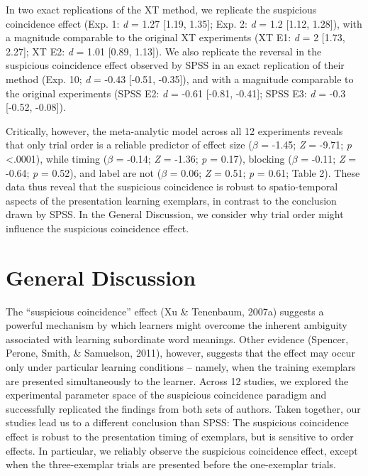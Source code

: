 \documentclass[english,floatsintext,man]{apa6}
\newcounter{author}
\theoremstyle{definition}
\theoremstyle{definition}
\theoremstyle{definition}
\theoremstyle{remark}
\begin{document}
In two exact replications of the XT method, we replicate the suspicious
coincidence effect (Exp. 1: \emph{d} = 1.27 {[}1.19, 1.35{]}; Exp. 2:
\emph{d} = 1.2 {[}1.12, 1.28{]}), with a magnitude comparable to the
original XT experiments (XT E1: \emph{d} = 2 {[}1.73, 2.27{]}; XT E2:
\emph{d} = 1.01 {[}0.89, 1.13{]}). We also replicate the reversal in the
suspicious coincidence effect observed by SPSS in an exact replication
of their method (Exp. 10; \emph{d} = -0.43 {[}-0.51, -0.35{]}), and with
a magnitude comparable to the original experiments (SPSS E2: \emph{d} =
-0.61 {[}-0.81, -0.41{]}; SPSS E3: \emph{d} = -0.3 {[}-0.52, -0.08{]}).

Critically, however, the meta-analytic model across all 12 experiments
reveals that only trial order is a reliable predictor of effect size
(\(\beta\) = -1.45; \emph{Z} = -9.71; \emph{p} \textless{}.0001), while
timing (\(\beta\) = -0.14; \emph{Z} = -1.36; \emph{p} = 0.17), blocking
(\(\beta\) = -0.11; \emph{Z} = -0.64; \emph{p} = 0.52), and label are
not (\(\beta\) = 0.06; \emph{Z} = 0.51; \emph{p} = 0.61; Table 2). These
data thus reveal that the suspicious coincidence is robust to
spatio-temporal aspects of the presentation learning exemplars, in
contrast to the conclusion drawn by SPSS. In the General Discussion, we
consider why trial order might influence the suspicious coincidence
effect.

\section{General Discussion}\label{general-discussion}

The ``suspicious coincidence'' effect (Xu \& Tenenbaum, 2007a) suggests
a powerful mechanism by which learners might overcome the inherent
ambiguity associated with learning subordinate word meanings. Other
evidence (Spencer, Perone, Smith, \& Samuelson, 2011), however, suggests
that the effect may occur only under particular learning conditions --
namely, when the training exemplars are presented simultaneously to the
learner. Across 12 studies, we explored the experimental parameter space
of the suspicious coincidence paradigm and successfully replicated the
findings from both sets of authors. Taken together, our studies lead us
to a different conclusion than SPSS: The suspicious coincidence effect
is robust to the presentation timing of exemplars, but is sensitive to
order effects. In particular, we reliably observe the suspicious
coincidence effect, except when the three-exemplar trials are presented
before the one-exemplar trials.
\end{document}
